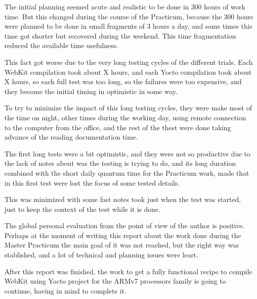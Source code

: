 \documentclass[a4paper,11pt,openany]{report}
\begin{document}
The initial planning seemed acute and realistic to be done in 300 hours of work time. But this changed during the course of the Practicum, because the 300 hours were planned to be done in small fragments of 3 hours a day, and some times this time got shorter but recovered during the weekend. This time fragmentation reduced the available time usefulness.

This fact got worse due to the very long testing cycles of the different trials. Each WebKit compilation took about X hours, and each Yocto compilation took about X hours, so each full test was too long, so the failures were too expensive, and they become the initial timing in optimistic in some way.

To try to minimize the impact of this long testing cycles, they were make most of the time on night, other times during the working day, using remote connection to the computer from the office, and the rest of the thest were done taking advance of the reading documentation time.

The first long tests were a bit optimistic, and they were not so productive due to the lack of notes about was the testing is trying to do, and its long duration combined with the short daily quantum time for the Practicum work, made that in this first test were lost the focus of some tested details.

This was minimized with some fast notes took just when the test was started, just to keep the context of the test while it is done.

The global personal evaluation from the point of view of the author is positive. Perhaps at the moment of writing this report about the work done during the Master Practicum the main goal of it was not reached, but the right way was stablished, and a lot of technical and planning issues were leart.

After this report was finished, the work to get a fully functional recipe to compile WebKit using Yocto project for the ARMv7 processors family is going to continue, having in mind to complete it.
\end{document}
